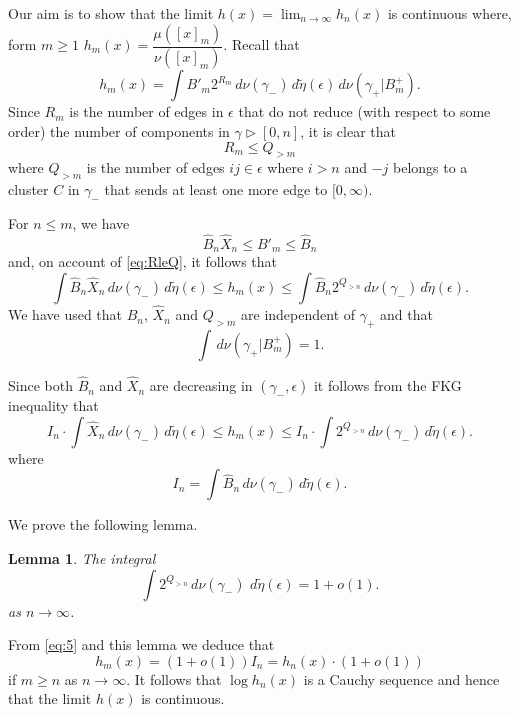 \documentclass[11pt, a4paper, oneside]{scrartcl}
\newtheorem{lemma}[thm]{Lemma}
\theoremstyle{definition}
\theoremstyle{remark}
\renewcommand{\d}{\,d}
\providecommand{\ordo}[1]{{o(#1)}}
\providecommand{\e}{\epsilon}
\providecommand{\tl}{\tilde}
\providecommand{\g}{\gamma}
\begin{document}

Our aim is to show that the limit $h(x)=\lim_{n\to\infty} h_n(x)$ is continuous where, form $m\ge1$
\(h_m(x) = \dfrac{\mu([x]_m)}{\nu([x]_m)}\).
Recall that
\begin{equation}\label{eq:3}
  h_m(x) =  \int B'_m 2^{R_m} \d \nu(\g_-)\d\tl\eta(\e) \d \nu(\g_+|B_m^+).
\end{equation}
Since $R_m$ is the number of edges in $\e$ that do not reduce (with respect to
some order) the number of components in $\g\triangleright [0,n]$, it is clear
that
\begin{equation}\label{eq:RleQ}
  R_m \le Q_{>m}
\end{equation}
where \(Q_{>m}\) is the number of edges $ij\in\e$ where $i>n$ and $-j$ belongs
to a cluster $C$ in $\g_-$ that sends at least one more edge to $[0,\infty)$.

For $n\le m$, we have
$$ \hat B_n \hat X_n \le B'_m \le \hat B_n $$
and, on account of \eqref{eq:RleQ}, it follows that
\begin{equation}\label{eq:4}
  \int \hat B_n \hat X_n \d \nu(\g_-) \d\tl\eta(\e)
  \le h_m(x) \le \int \hat B_n 2^{Q_{>n}} \d\nu(\g_-) \d\tl\eta(\e).
\end{equation}
We have used that $\hat B_n$, $\hat X_n$ and $Q_{>m}$ are independent of $\g_+$ and that
$$\int\d\nu(\g_+|B_m^+)=1. $$

Since both $\hat B_n$ and $\hat X_n$ are decreasing in $(\g_-,\e)$ it follows
from the FKG inequality that
\begin{equation}
  \label{eq:5}
  I_n \cdot \int \hat X_n \d\nu(\g_-) \d\tl\eta(\e)
  \le h_m(x)
  \le I_n \cdot \int 2^{Q_{>n}} \d\nu(\g_-) \d\tl\eta(\e).
\end{equation}
where
\begin{equation}
  \label{eq:6}
  I_n = \int \hat B_n \d\nu(\g_-) \d\tl\eta(\e).
\end{equation}

We prove the following lemma.
\begin{lemma}\label{lem:qn}
  The integral
  \[
    \int 2^{Q_{>n}} \d\nu(\g_-)\, \d\tilde\eta(\e) = 1+\ordo{1}.
  \]
  as $n\to\infty$.
\end{lemma}

From \eqref{eq:5} and this lemma we deduce that
\begin{equation}
  \label{eq:2}
  h_m(x) = (1+\ordo1) I_n = h_n(x) \cdot (1+\ordo1)
\end{equation}
if $m\ge n$ as $n\to\infty$. It follows that $\log h_n(x)$ is a Cauchy sequence
and hence that the limit $h(x)$ is continuous.
\end{document}
